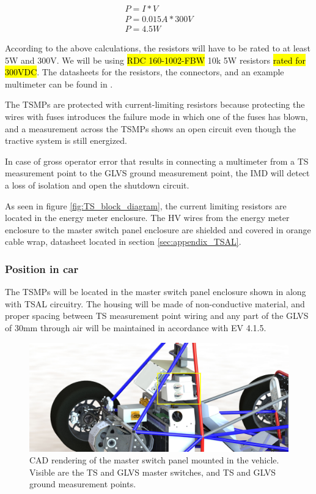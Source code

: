 \documentclass{article}
\begin{document}
\begin{align*}
P = I * V \\
P = 0.015A * 300V \\
P = 4.5W
\end{align*}

According to the above calculations, the resistors will have to be rated to at least 5W and 300V. We will be using \hl{RDC 160-1002-FBW} 10k 5W resistors \hl{rated for 300VDC}. The datasheets for the resistors, the connectors, and an example multimeter can be found in .

The TSMPs are protected with current-limiting resistors because protecting the wires with fuses introduces the failure mode in which one of the fuses has blown, and a measurement across the TSMPs shows an open circuit even though the tractive system is still energized. 

In case of gross operator error that results in connecting a multimeter from a TS measurement point to the GLVS ground measurement point, the IMD will detect a loss of isolation and open the shutdown circuit. 

As seen in figure \ref{fig:TS_block_diagram}, the current limiting resistors are located in the energy meter enclosure. The HV wires from the energy meter enclosure to the master switch panel enclosure are shielded and covered in orange cable wrap, datasheet located in section \ref{sec:appendix_TSAL}.

\subsubsection{Position in car}
The TSMPs will be located in the master switch panel enclosure shown in  along with TSAL circuitry. The housing will be made of non-conductive material, and proper spacing between TS measurement point wiring and any part of the GLVS of 30mm through air will be maintained in accordance with EV 4.1.5.

\begin{figure}[H]
\centering
\includegraphics[width=\textwidth]{MSP_mount_angle.jpg}
\caption{CAD rendering of the master switch panel mounted in the vehicle. Visible are the TS and GLVS master switches, and TS and GLVS ground measurement points.}
\label{fig:master_switch_panel}
\end{figure}
\end{document}
